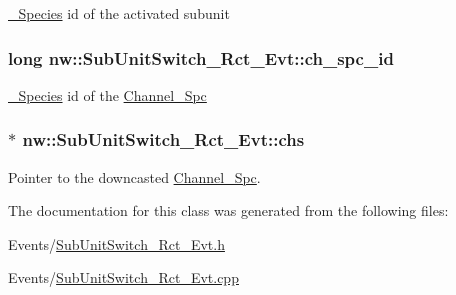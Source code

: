\hyperlink{classnw_1_1___species}{\+\_\+\+Species} id of the activated subunit 

\hypertarget{classnw_1_1_sub_unit_switch___rct___evt_a7d1c65995bc49d7e6e625aa090325af1}{
\subsubsection[{ch\+\_\+spc\+\_\+id}]{\setlength{\rightskip}{0pt plus 5cm}long nw\+::\+Sub\+Unit\+Switch\+\_\+\+Rct\+\_\+\+Evt\+::ch\+\_\+spc\+\_\+id\hspace{0.3cm}{\ttfamily [private]}}}\label{classnw_1_1_sub_unit_switch___rct___evt_a7d1c65995bc49d7e6e625aa090325af1}


\hyperlink{classnw_1_1___species}{\+\_\+\+Species} id of the \hyperlink{classnw_1_1_channel___spc}{Channel\+\_\+\+Spc} 

\hypertarget{classnw_1_1_sub_unit_switch___rct___evt_a260fabe9e3e1d8b79c3c80bb987716a5}{
\subsubsection[{chs}]{$\ast$ nw\+::\+Sub\+Unit\+Switch\+\_\+\+Rct\+\_\+\+Evt\+::chs\hspace{0.3cm}{\ttfamily [private]}}}\label{classnw_1_1_sub_unit_switch___rct___evt_a260fabe9e3e1d8b79c3c80bb987716a5}


Pointer to the downcasted \hyperlink{classnw_1_1_channel___spc}{Channel\+\_\+\+Spc}. 



The documentation for this class was generated from the following files\+:\begin{DoxyCompactItemize}
\item 
Events/\hyperlink{_sub_unit_switch___rct___evt_8h}{Sub\+Unit\+Switch\+\_\+\+Rct\+\_\+\+Evt.\+h}\item 
Events/\hyperlink{_sub_unit_switch___rct___evt_8cpp}{Sub\+Unit\+Switch\+\_\+\+Rct\+\_\+\+Evt.\+cpp}\end{DoxyCompactItemize}
